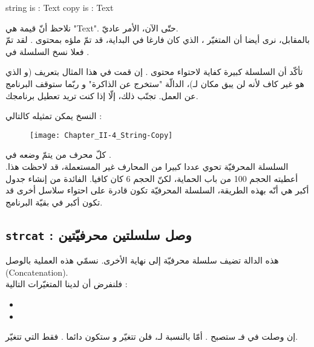 \begin{Console}
string is : Text
copy is : Text
\end{Console}

نلاحظ أنّ قيمة
هي
"\textenglish{Text}".
حتّى الآن، الأمر عاديّ.\\
بالمقابل، نرى أيضا أن المتغيّر
،
الذي كان فارغا في البداية، قد تمّ ملؤه بمحتوى
.
لقد تمّ فعلا نسخ السلسلة في
.

\begin{warning}
  تأكّد أن السلسلة
  كبيرة كفاية لاحتواء محتوى
  .
  إن قمت في هذا المثال بتعريف
(و الذي هو غير كاف لأنه لن يبق مكان لـ)،
  الدالّة
  "ستخرج عن الذاكرة" و ربّما ستوقف البرنامج عن العمل. تجنّب ذلك، إلّا إذا كنت تريد تعطيل برنامجك.
\end{warning}

النسخ يمكن تمثيله كالتالي :

\begin{figure}[H]
	\centering
	\texttt{[image: Chapter\_II-4\_String-Copy]}
\end{figure}
كلّ محرف من
يتمّ وضعه في
.\\
السلسلة المحرفيّة
تحوي عددا كبيرا من المحارف غير المستعملة، قد لاحظت هذا. أعطيته الحجم 100 من باب الحماية، لكنّ الحجم 6 كان كافيا.
الفائدة من إنشاء جدول أكبر هي أنّه بهذه الطريقة، السلسلة المحرفيّة
تكون قادرة على احتواء سلاسل أخرى قد تكون أكبر في بقيّة البرنامج.

\subsection{\texttt{strcat} : وصل سلسلتين محرفيّتين}

هذه الدالة تضيف سلسلة محرفيّة إلى نهاية الأخرى. نسمّي هذه العملية بالوصل
(\textenglish{Concatenation}).\\
فلنفرض أن لدينا المتغيّرات التالية :

\begin{itemize}
  \item {}
  \item {}
\end{itemize}

إن وصلت
في
فـ
ستصبح
.
أمّا بالنسبة لـ،
فلن تتغيّر و ستكون دائما
.
فقط
التي تتغيّر.

